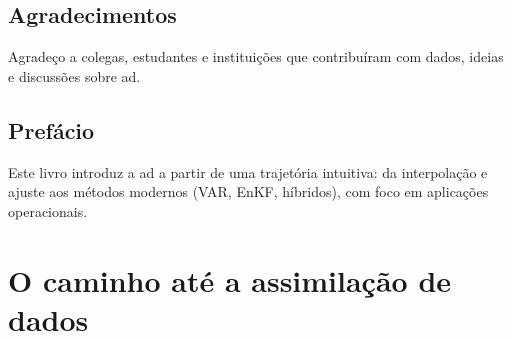 \documentclass[12pt,a4paper,oneside]{book}
\begin{document}
\chapter*{Agradecimentos}
Agradeço a colegas, estudantes e instituições que contribuíram com dados, ideias e discussões sobre \gls{ad}.

\chapter*{Prefácio}
Este livro introduz a \gls{ad} a partir de uma trajetória intuitiva: da interpolação e ajuste aos métodos modernos (VAR, EnKF, híbridos), com foco em aplicações operacionais.

\tableofcontents

\mainmatter

\part{O caminho até a assimilação de dados}

%
%
\end{document}

